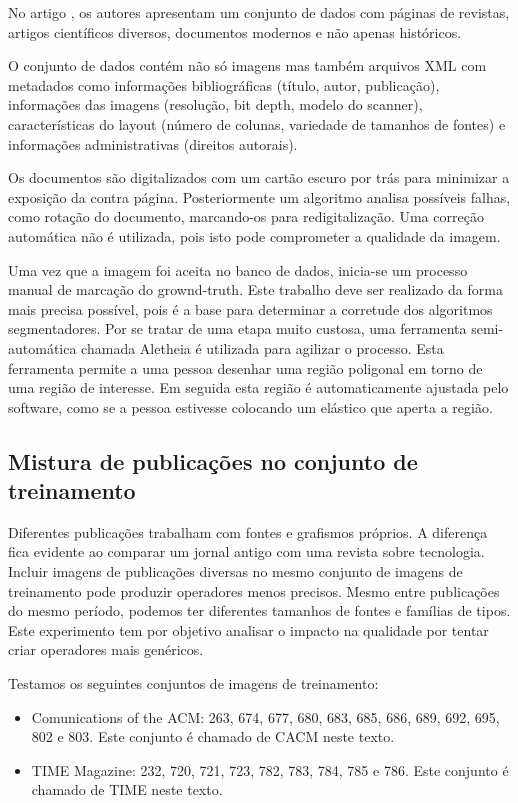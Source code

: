 \documentclass[a4paper,11pt]{article}
\begin{document}
    No artigo \cite{Antonacopoulos09arealistic}, os autores apresentam um conjunto de dados com páginas de revistas, artigos científicos diversos, documentos modernos e não apenas históricos.

    O conjunto de dados contém não só imagens mas também arquivos XML \cite{pletschacher2010page} com metadados como informações bibliográficas (título, autor, publicação), informações das imagens (resolução, bit depth, modelo do scanner), características do layout (número de colunas, variedade de tamanhos de fontes) e informações administrativas (direitos autorais).

    Os documentos são digitalizados com um cartão escuro por trás para minimizar a exposição da contra página. Posteriormente um algoritmo analisa possíveis falhas, como rotação do documento, marcando-os para redigitalização. Uma correção automática não é utilizada, pois isto pode comprometer a qualidade da imagem.

    Uma vez que a imagem foi aceita no banco de dados, inicia-se um processo manual de marcação do grownd-truth. Este trabalho deve ser realizado da forma mais precisa possível, pois é a base para determinar a corretude dos algoritmos segmentadores. Por se tratar de uma etapa muito custosa, uma ferramenta semi-automática chamada Aletheia \cite{clausner2011aletheia} é utilizada para agilizar o processo. Esta ferramenta permite a uma pessoa desenhar uma região poligonal em torno de uma região de interesse. Em seguida esta região é automaticamente ajustada pelo software, como se a pessoa estivesse colocando um elástico que aperta a região.

  \subsection{Mistura de publicações no conjunto de treinamento}

    Diferentes publicações trabalham com fontes e grafismos próprios. A diferença fica evidente ao comparar um jornal antigo com uma revista sobre tecnologia. Incluir imagens de publicações diversas no mesmo conjunto de imagens de treinamento pode produzir operadores menos precisos. Mesmo entre publicações do mesmo período, podemos ter diferentes tamanhos de fontes e famílias de tipos. Este experimento tem por objetivo analisar o impacto na qualidade por tentar criar operadores mais genéricos.

    Testamos os seguintes conjuntos de imagens de treinamento:

    \begin{itemize}
      \item Comunications of the ACM: 263, 674, 677, 680, 683, 685, 686, 689, 692, 695, 802 e 803. Este conjunto é chamado de CACM neste texto.
      \item TIME Magazine: 232, 720, 721, 723, 782, 783, 784, 785 e 786. Este conjunto é chamado de TIME neste texto.
    \end{itemize}
\end{document}

